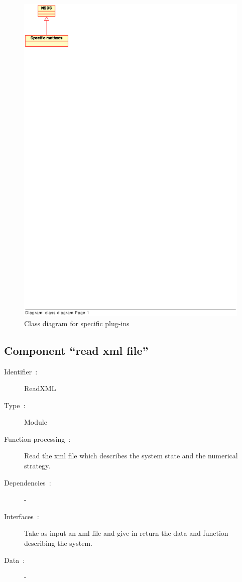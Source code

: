 	\begin{figure}
	\begin{center}
	\includegraphics[bb=20 700 160 820, clip]{figure/class_specific_plugins.ps}
	\caption{Class diagram for specific plug-ins}
	\label{fig: Class diagram for specific plug-ins}
	\end{center}
	\end{figure}
	
	
  	\subsection{Component ``read \acs{xml} file''}
	
		\begin{description}
	
		\item[Identifier~:]ReadXML
		\item[Type~:]Module
		\item[Function-processing~:]Read the \ac{xml} file which describes the system state and the numerical strategy.
		\item[Dependencies~:]-
		\item[Interfaces~:]Take as input an \ac{xml} file and give in return the data and function describing the system.
		\item[Data~:]-

		\end{description}
	
